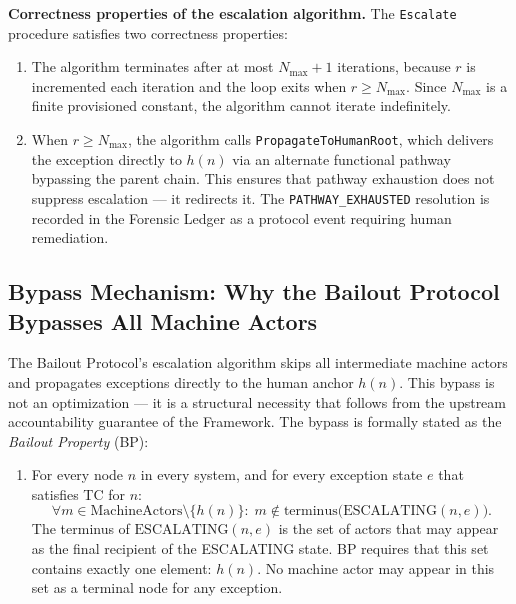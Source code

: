 \bigskip
\noindent\textbf{Correctness properties of the escalation algorithm.} The \texttt{Escalate} procedure satisfies two correctness properties:

\begin{enumerate}
\item[\textbf{Termination (liveness).}] The algorithm terminates after at most $N_{\max} + 1$ iterations, because $r$ is incremented each iteration and the loop exits when $r \geq N_{\max}$. Since $N_{\max}$ is a finite provisioned constant, the algorithm cannot iterate indefinitely.

\item[\textbf{Pathway exhaustion safety.}] When $r \geq N_{\max}$, the algorithm calls \texttt{PropagateToHumanRoot}, which delivers the exception directly to $h(n)$ via an alternate functional pathway bypassing the parent chain. This ensures that pathway exhaustion does not suppress escalation --- it redirects it. The \texttt{PATHWAY\_EXHAUSTED} resolution is recorded in the Forensic Ledger as a protocol event requiring human remediation.
\end{enumerate}

\subsection{Bypass Mechanism: Why the Bailout Protocol Bypasses All Machine Actors}\label{sec:bypass}

The Bailout Protocol's escalation algorithm skips all intermediate machine actors and propagates exceptions directly to the human anchor $h(n)$. This bypass is not an optimization --- it is a structural necessity that follows from the upstream accountability guarantee of the \bxthree{} Framework. The bypass is formally stated as the \emph{Bailout Property} (BP):

\begin{enumerate}
\item[\textbf{Bailout Property (BP).}] For every node $n$ in every \bxthree{} system, and for every exception state $e$ that satisfies TC for $n$:
\begin{equation}
\forall m \in \text{MachineActors} \setminus \{h(n)\}:\; m \notin \text{terminus}\bigl(\text{ESCALATING}(n, e)\bigr). \tag{BP}
\end{equation}
The terminus of $\text{ESCALATING}(n, e)$ is the set of actors that may appear as the final recipient of the ESCALATING state. BP requires that this set contains exactly one element: $h(n)$. No machine actor may appear in this set as a terminal node for any exception.
\end{enumerate}

